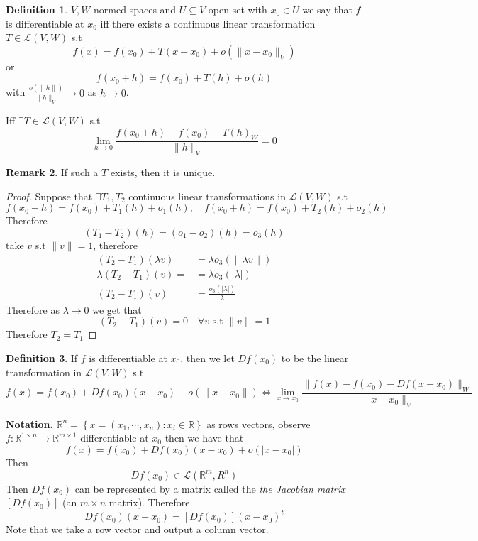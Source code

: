 \documentclass[11pt,a4paper]{article}
\theoremstyle{definition}
\newtheorem{definition}{Definition}[section]
\newtheorem{remark}[definition]{Remark}
\theoremstyle{plain}
\theoremstyle{remark}
\newcommand{\R}{\mathbb{R}}
\renewcommand{\set}[1]{\left\{ #1 \right\}}
\newcommand{\abs}[1]{\lvert #1 \rvert}
\newcommand{\norm}[1]{\lVert #1 \rVert}
\begin{document}
\begin{definition}
    $V,W$ normed spaces and $U \subseteq V$ open set with $x_0 \in U$ we say that $f$ is differentiable at $x_0$ iff there exists a continuous 
    linear transformation $T \in \mathcal{L}(V,W)$ s.t 
    $$f(x) = f(x_0) + T(x - x_0) + o (\norm{x - x_0}_V)$$
    or 
    $$f(x_0 + h) = f(x_0) + T(h) + o(h)$$
    with $\frac{o(\norm{h})}{\norm{h}_V} \to 0$ as $h \to 0$. 

    Iff $\exists T \in \mathcal{L}(V,W)$ s.t 
    $$\lim_{h \to 0} \frac{{f(x_0 + h) - f(x_0) - T(h)}_W}{\norm{h}_V} = 0$$
\end{definition}

\begin{remark}
    If such a $T$ exists, then it is unique. 
\end{remark}

\begin{proof}
    Suppose that $\exists T_1, T_2$ continuous linear transformations in $\mathcal{L}(V, W)$ s.t 
    $$f(x_0 + h) = f(x_0) + T_1(h)+ o_1(h), \quad f(x_0 + h) = f(x_0) + T_2(h) + o_2(h)$$
    Therefore 
    $$(T_1 - T_2) (h) =  (o_1 - o_2) (h) = o_3(h)$$
    take $v$ s.t $\norm{v} = 1$, therefore 
    \begin{align*}
        (T_2 - T_1) (\lambda v) &= \lambda o_3(\norm{\lambda v}) \\
        \lambda (T_2 - T_1) (v) = &= \lambda o_3(\abs{\lambda}) \\
        (T_2 - T_1) (v) &= \frac{o_3(\abs{\lambda})}{\lambda}
    \end{align*}
    Therefore as $\lambda \to 0$ we get that 
    $$(T_2 - T_1) (v) = 0 \quad \forall v \text{ s.t } \norm{v} = 1$$
    Therefore $T_2 = T_1$
\end{proof}

\begin{definition}
    If $f$ is differentiable at $x_0$, then we let 
    $Df(x_0)$ to be the linear transformation in $\mathcal{L}(V,W)$ s.t 
    $$f(x) = f(x_0) + Df(x_0) (x - x_0) + o(\norm{x - x_0}) \iff \lim_{x \to x_0} \frac{\norm{f(x) - f(x_0) - Df(x-x_0)}_W}{\norm{x - x_0}_V}$$
\end{definition}

\textbf{Notation.} $\R^n = \set{x = (x_1, \cdots, x_n) \colon x_i \in \R}$ as rows vectors, observe $f \colon \R^{1 \times n} \to \R^{m \times 1}$ differentiable at $x_0$ then 
we have that 
$$f(x) = f(x_0) + Df(x_0) (x-x_0) + o(|x-x_0|)$$
Then 
$$Df(x_0) \in \mathcal{L} (\R^m, R^n)$$
Then $Df(x_0)$ can be represented by a matrix called the \emph{the Jacobian matrix} $[Df(x_0)]$ (an $m \times n$ matrix). Therefore 
$$Df(x_0) (x - x_0) = [Df(x_0)] (x - x_0)^t$$
Note that we take a row vector and output a column vector. 
\end{document}

